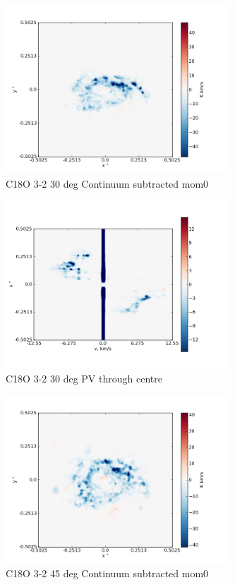 \documentclass[useAMS,usenatbib]{mn2e}
\begin{document}
\begin{figure}
 \includegraphics[width=84mm]{Figures/sim/imageC18O_3-2_30deg_contSub.png}

 \caption{C18O 3-2  30 deg Continuum subtracted mom0}
\end{figure}




%

\begin{figure}
 \includegraphics[width=84mm]{Figures/sim/imageC18O_3-2_30deg_PV_centre.png}

 \caption{C18O 3-2 30 deg PV through centre}
\end{figure}

\begin{figure}
 \includegraphics[width=84mm]{Figures/sim/imageC18O_3-2_45deg_contSub.png}

 \caption{C18O 3-2 45 deg Continuum subtracted mom0}
\end{figure}
\end{document}
